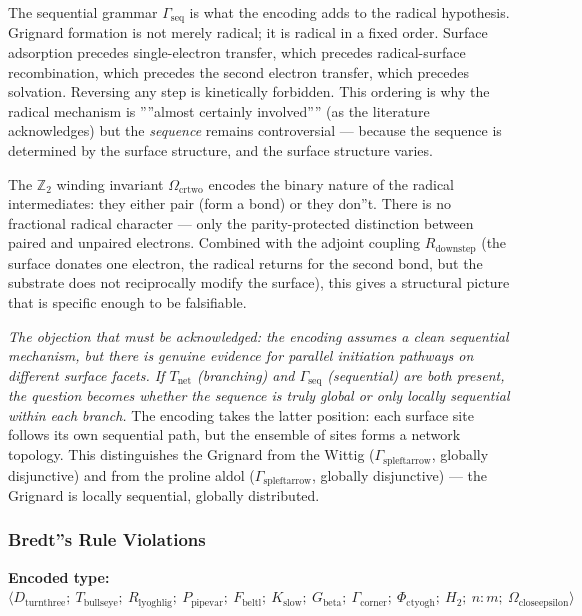\documentclass[12pt,a4paper]{article}
\begin{document}
The sequential grammar $\Gamma_\textrm{seq}$ is what the encoding adds to the radical hypothesis. Grignard formation is not merely radical; it is radical in a fixed order. Surface adsorption precedes single-electron transfer, which precedes radical-surface recombination, which precedes the second electron transfer, which precedes solvation. Reversing any step is kinetically forbidden. This ordering is why the radical mechanism is ''''almost certainly involved'''' (as the literature acknowledges) but the \emph{sequence} remains controversial --- because the sequence is determined by the surface structure, and the surface structure varies.

The $\mathbb{Z}_2$ winding invariant $\Omega_{\text{crtwo}}$ encodes the binary nature of the radical intermediates: they either pair (form a bond) or they don''t. There is no fractional radical character --- only the parity-protected distinction between paired and unpaired electrons. Combined with the adjoint coupling $R_{\text{downstep}}$ (the surface donates one electron, the radical returns for the second bond, but the substrate does not reciprocally modify the surface), this gives a structural picture that is specific enough to be falsifiable.

\emph{The objection that must be acknowledged: the encoding assumes a clean sequential mechanism, but there is genuine evidence for parallel initiation pathways on different surface facets. If $T_\textrm{net}$ (branching) and $\Gamma_\textrm{seq}$ (sequential) are both present, the question becomes whether the sequence is truly global or only locally sequential within each branch.} The encoding takes the latter position: each surface site follows its own sequential path, but the ensemble of sites forms a network topology. This distinguishes the Grignard from the Wittig ($\Gamma_{\text{spleftarrow}}$, globally disjunctive) and from the proline aldol ($\Gamma_{\text{spleftarrow}}$, globally disjunctive) --- the Grignard is locally sequential, globally distributed.

\subsubsection{Bredt''s Rule Violations}

\textbf{Encoded type:} $\langle D_{\text{turnthree}};\ T_{\text{bullseye}};\ R_{\text{lyoghlig}};\ P_{\text{pipevar}};\ F_{\text{beltl}};\ K_\textrm{slow};\ G_{\text{beta}};\ \Gamma_{\text{corner}};\ \Phi_{\text{ctyogh}};\ H_2;\ n{:}m;\ \Omega_{\text{closeepsilon}} \rangle$
\end{document}
